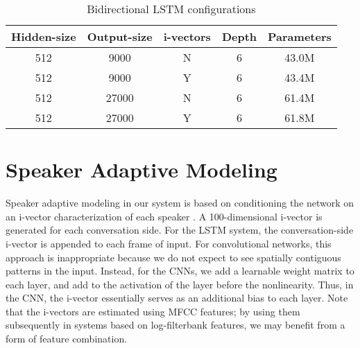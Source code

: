 \documentclass{article}
\begin{document}
\begin{table}[tbh]
    \centering
\caption{Bidirectional LSTM configurations}
\label{tab:lstm}
    \small
    \begin{tabular}{|c|c|c|c|c|}
    \hline
Hidden-size & Output-size & i-vectors & Depth & Parameters  \\ \hline
512 & 9000 & N & 6 & 43.0M \\ \hline
512 & 9000 & Y & 6 & 43.4M \\ \hline
512 & 27000 & N & 6 & 61.4M \\ \hline
512 & 27000 & Y & 6 & 61.8M \\ \hline
    \end{tabular}
\end{table}


\section{Speaker Adaptive Modeling}
\label{sec:sam}









Speaker adaptive modeling in our system is based on 
conditioning the network on an i-vector  \cite{dehak2011front}  
characterization of each 
speaker \cite{saon2013speaker,saonSRK16}.
A 100-dimensional i-vector is generated for each conversation side.
For the LSTM system,
the conversation-side i-vector  is appended to each frame of input.
For convolutional networks, this approach is inappropriate because
we do not expect to see spatially contiguous patterns in the input.
Instead, for the CNNs, we add a learnable weight matrix  to each 
layer, and add  to the activation of the layer before the 
nonlinearity. Thus, in the CNN, the i-vector essentially serves as an 
additional bias to each layer. Note that the i-vectors are estimated
using MFCC features; by using them subsequently in systems based on
log-filterbank features, we may benefit from a form of feature 
combination.
\end{document}
